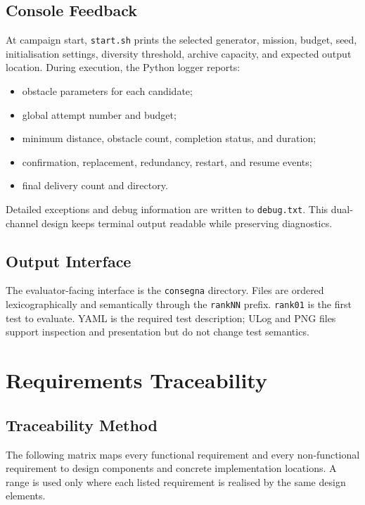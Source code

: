 \documentclass[11pt,a4paper]{report}
\newcommand{\code}[1]{\texttt{#1}}
\begin{document}
\section{Console Feedback}
At campaign start, \code{start.sh} prints the selected generator, mission, budget, seed, initialisation settings, diversity threshold, archive capacity, and expected output location. During execution, the Python logger reports:
\begin{itemize}
  \item obstacle parameters for each candidate;
  \item global attempt number and budget;
  \item minimum distance, obstacle count, completion status, and duration;
  \item confirmation, replacement, redundancy, restart, and resume events;
  \item final delivery count and directory.
\end{itemize}

Detailed exceptions and debug information are written to \code{debug.txt}. This dual-channel design keeps terminal output readable while preserving diagnostics.

\section{Output Interface}
The evaluator-facing interface is the \code{consegna} directory. Files are ordered lexicographically and semantically through the \code{rankNN} prefix. \code{rank01} is the first test to evaluate. YAML is the required test description; ULog and PNG files support inspection and presentation but do not change test semantics.

\chapter{Requirements Traceability}

\section{Traceability Method}
The following matrix maps every functional requirement and every non-functional requirement to design components and concrete implementation locations. A range is used only where each listed requirement is realised by the same design elements.
\end{document}
